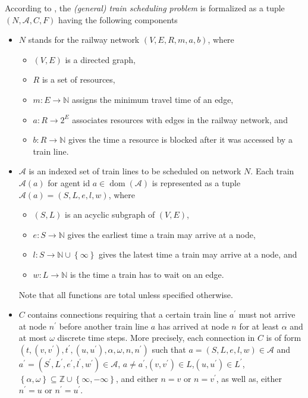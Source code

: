 \documentclass{article}
\DeclareMathOperator{\dom}{dom}
\begin{document}
According to \cite{DBLP:journals/corr/abs-2003-08598},  the \emph{(general) train scheduling problem} is formalized as a tuple $(N, \mathcal{A}, C, F)$ having the following components
\begin{itemize}
    \item $N$ stands for the railway network $(V, E, R, m, a, b)$, where
        \begin{itemize}
            \item $(V, E)$ is a directed graph,
            \item $R$ is a set of resources,
            \item $m:E\to\mathbb{N}$ assigns the minimum travel time of an edge,
            \item $a: R\to 2^E$ associates resources with edges in the railway network, and
            \item $b:R\to \mathbb{N}$ gives the time a resource is blocked after it was accessed by a train line.
        \end{itemize}
    \item $\mathcal{A}$ is an indexed set of train lines to be scheduled on network $N$. Each train $\mathcal{A}(a)$ for agent id $a\in \dom(\mathcal{A})$ is represented as a tuple $\mathcal{A}(a)=(S, L, e, l, w)$, where
        \begin{itemize}
            \item $(S, L)$ is an acyclic subgraph of $(V, E)$,
            \item $e:S \to \mathbb{N}$ gives the earliest time a train may arrive at a node,
            \item $l:S\to \mathbb{N} \cup \left\{\infty\right\}$ gives the latest time a train may arrive at a node, and
            \item $w:L\to \mathbb{N}$ is the time a train has to wait on an edge.
        \end{itemize}
        Note that all functions are total unless specified otherwise.
        \item $C$ contains connections requiring that a certain train line $a^\prime$ must not arrive at node $n^\prime$ before another train line $a $ has arrived at node $n$ for at least $\alpha$ and at most $\omega$ discrete time steps. More precisely, each connection in $C$ is of form $(t,(v, v^\prime), t^\prime,(u, u^\prime), \alpha, \omega, n, n^\prime)$ such that $a= (S, L, e, l, w)\in \mathcal{A}$ and $a^\prime= (S^\prime, L^\prime, e^\prime, l^\prime, w^\prime)\in \mathcal{A}$, $a\not=a^\prime$,$(v, v^\prime)\in L$,$(u, u^\prime)\in L^\prime$,$\left\{\alpha,\omega\right\} \subseteq \mathbb{Z} \cup \left\{\infty,-\infty\right\}$, and either $n=v$ or $n=v^\prime$, as well as, either $n^\prime=u$ or $n^\prime=u^\prime$.

\end{itemize}
\end{document}
